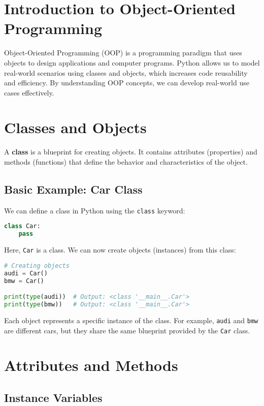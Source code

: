 \section{Introduction to Object-Oriented Programming}

Object-Oriented Programming (OOP) is a programming paradigm that uses objects to design applications and computer programs. Python allows us to model real-world scenarios using classes and objects, which increases code reusability and efficiency. By understanding OOP concepts, we can develop real-world use cases effectively.

\section{Classes and Objects}

A \textbf{class} is a blueprint for creating objects. It contains attributes (properties) and methods (functions) that define the behavior and characteristics of the object. 

\subsection{Basic Example: Car Class}

We can define a class in Python using the \texttt{class} keyword:

\begin{lstlisting}[language=Python]
class Car:
    pass
\end{lstlisting}

Here, \texttt{Car} is a class. We can now create objects (instances) from this class:

\begin{lstlisting}[language=Python]
# Creating objects
audi = Car()
bmw = Car()

print(type(audi))  # Output: <class '__main__.Car'>
print(type(bmw))   # Output: <class '__main__.Car'>
\end{lstlisting}

Each object represents a specific instance of the class. For example, \texttt{audi} and \texttt{bmw} are different cars, but they share the same blueprint provided by the \texttt{Car} class.

\section{Attributes and Methods}

\subsection{Instance Variables}

